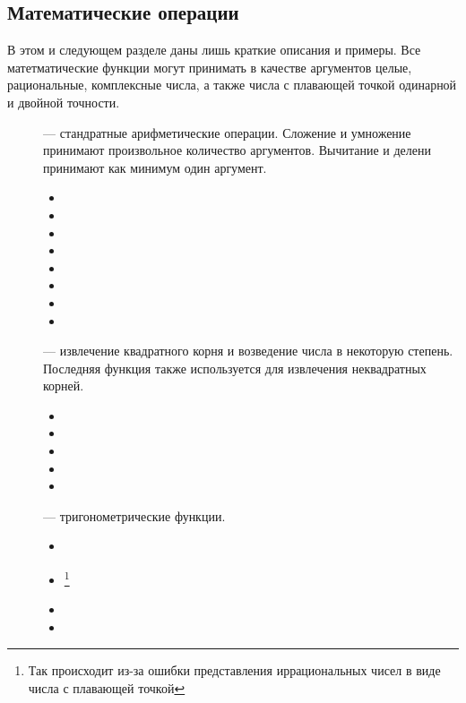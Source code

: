 \documentclass[a4paper, 12pt, titlepage, twoside]{article}
\newenvironment{examples}
               {\begin{itemize}\renewcommand{\labelitemi}{ }}
               {\end{itemize}}
\begin{document}
\subsection{Математические операции}
В этом и следующем разделе даны лишь краткие описания и примеры. Все матетматические функции могут принимать в качестве аргументов целые, рациональные, комплексные числа, а также числа с плавающей точкой одинарной и двойной точности.
\begin{description}
  \item [\lisp{+ - * /}] --- стандратные арифметические операции. Сложение и умножение принимают произвольное количество аргументов. Вычитание и делени принимают как минимум один аргумент.
    \begin{examples}
      \item {}
      \item {}
      \item {}
      \item {}
      \item {}
      \item {}
      \item {}
      \item {}
    \end{examples}
  \item [] --- извлечение квадратного корня и возведение числа в некоторую степень. Последняя функция также используется для извлечения неквадратных корней.
    \begin{examples}
    \item {}
    \item {}
    \item {}
    \item {}
    \item {}
    \end{examples}
  \item [] --- тригонометрические функции.
    \begin{examples}
    \item {}
    \item {}\footnote{Так происходит из-за ошибки представления иррациональных чисел в виде числа с плавающей точкой}
    \item {}
    \item {}
    \end{examples}
\end{description}
\end{document}
